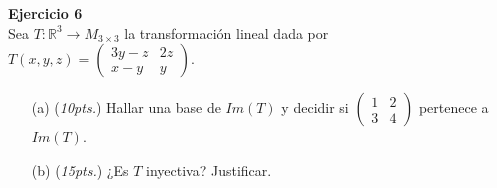 \documentclass{article}
\newenvironment{problem}[2][Ejercicio]
    { \begin{mdframed}[backgroundcolor=gray!20] \textbf{#1 #2} \\}
    {  \end{mdframed}}
\begin{document}
\begin{problem}{6}
    Sea $T:\mathbb{R}^3 \to M_{3\times 3}$ la transformación lineal dada por $T(x,y,z) = \begin{pmatrix} 3y-z & 2z \\ x-y & y \end{pmatrix}$.
    \begin{itemize}
        \item[(a)] (\textit{10pts.}) Hallar una base de $Im(T)$ y decidir si $\begin{pmatrix} 1 & 2 \\ 3 & 4 \end{pmatrix}$ pertenece a $Im(T)$.
        \item[(b)] (\textit{15pts.}) ¿Es $T$ inyectiva? Justificar. 
    \end{itemize}
\end{problem}
\end{document}
